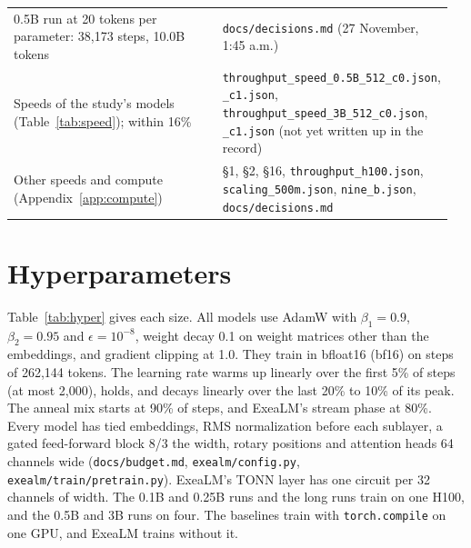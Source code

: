\documentclass[10pt,twocolumn,letterpaper]{article}
\newcommand{\sect}[1]{\S#1}
\begin{document}
\begin{longtable}{@{}>{\raggedright\arraybackslash}p{0.56\linewidth} >{\raggedright\arraybackslash}p{0.40\linewidth}@{}}
0.5B run at 20 tokens per parameter: 38,173 steps, 10.0B tokens & \texttt{docs/decisions.md} (27 November, 1:45 a.m.) \\
Speeds of the study's models (Table~\ref{tab:speed}); within 16\% & \texttt{throughput\_speed\_0.5B\_512\_c0.json}, \texttt{\_c1.json}, \texttt{throughput\_speed\_3B\_512\_c0.json}, \texttt{\_c1.json} (not yet written up in the record) \\
Other speeds and compute (Appendix~\ref{app:compute}) & \sect{1}, \sect{2}, \sect{16}, \texttt{throughput\_h100.json}, \texttt{scaling\_500m.json}, \texttt{nine\_b.json}, \texttt{docs/decisions.md} \\
\end{longtable}
\normalsize

\section{Hyperparameters}
\label{app:hyper}

Table~\ref{tab:hyper} gives each size.
All models use AdamW with $\beta_1 = 0.9$, $\beta_2 = 0.95$ and $\epsilon = 10^{-8}$, weight decay 0.1 on weight matrices other than the embeddings, and gradient clipping at 1.0.
They train in bfloat16 (bf16) on steps of 262,144 tokens.
The learning rate warms up linearly over the first 5\% of steps (at most 2,000), holds, and decays linearly over the last 20\% to 10\% of its peak.
The anneal mix starts at 90\% of steps, and ExeaLM's stream phase at 80\%.
Every model has tied embeddings, RMS normalization before each sublayer, a gated feed-forward block 8/3 the width, rotary positions and attention heads 64 channels wide (\texttt{docs/budget.md}, \texttt{exealm/config.py}, \texttt{exealm/train/pretrain.py}).
ExeaLM's TONN layer has one circuit per 32 channels of width.
The 0.1B and 0.25B runs and the long runs train on one H100, and the 0.5B and 3B runs on four.
The baselines train with \texttt{torch.compile} on one GPU, and ExeaLM trains without it.
\end{document}
